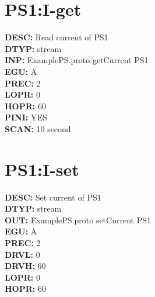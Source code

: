\documentclass[12pt]{article}
\begin{document}
\section{PS1:I-get}
\textbf{DESC: }Read current of PS1 \\
\textbf{DTYP: }stream \\
\textbf{INP: }ExamplePS.proto getCurrent PS1 \\
\textbf{EGU: }A \\
\textbf{PREC: }2 \\
\textbf{LOPR: }0 \\
\textbf{HOPR: }60 \\
\textbf{PINI: }YES \\
\textbf{SCAN: }10 second \\
\newpage
\section{PS1:I-set}
\textbf{DESC: }Set current of PS1 \\
\textbf{DTYP: }stream \\
\textbf{OUT: }ExamplePS.proto setCurrent PS1 \\
\textbf{EGU: }A \\
\textbf{PREC: }2 \\
\textbf{DRVL: }0 \\
\textbf{DRVH: }60 \\
\textbf{LOPR: }0 \\
\textbf{HOPR: }60 \\
\newpage
\end{document}

